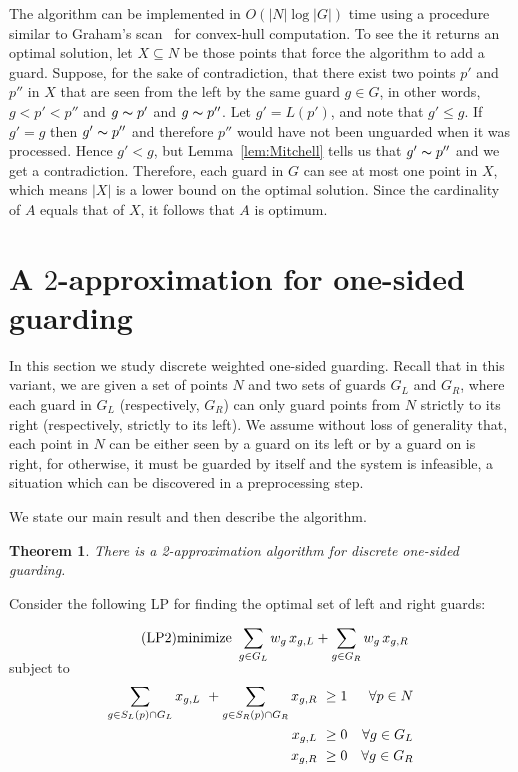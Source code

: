 \documentclass[11pt]{article}
\newcommand{\sees}{\thicksim}
\newtheorem{theorem}{Theorem}
\begin{document}
The algorithm can be implemented in $O(|N|\log|G|)$ time using a procedure
similar to Graham's scan~\cite{journals/ipl/Graham72} for convex-hull
computation. To see the it returns an optimal solution, let $X \subseteq N$ be
those points that force the algorithm to add a guard. Suppose, for the sake of
contradiction, that there exist two points $p'$ and $p''$ in $X$ that are seen
from the left by the same guard $g \in G$, in other words, $g< p'<p''$ and $g
\sees p'$ and $g \sees p''$. Let $g'=L(p')$, and note that $g'
\le g$. If $g' = g$ then $g'\sees p''$ and therefore $p''$ would have not been
unguarded when it was processed. Hence $g'<g$, but Lemma~\ref{lem:Mitchell}
tells us that $g'\sees p''$ and we get a contradiction. Therefore, each guard
in $G$ can see at most one point in $X$, which means $|X|$ is a lower bound on
the optimal solution. Since the cardinality of $A$ equals that of $X$, it
follows that $A$ is optimum.







\section{A $2$-approximation for one-sided guarding}
\label{sec:one-sided-guarding}

In this section we study discrete weighted one-sided guarding. Recall that in
this variant, we are given a set of points $N$ and two sets of guards $G_L$
and $G_R$, where each guard in $G_L$ (respectively, $G_R$) can only guard
points from $N$ strictly to its right (respectively, strictly to its left).
We assume without loss of generality that, each point in $N$ can be either
seen by a guard on its left or by a guard on is right, for otherwise, it must
be guarded by itself and the system is infeasible, a situation which can be
discovered in a preprocessing step.

We state our main result and then describe the algorithm.

\begin{theorem} \label{thm:one-sided}
  There is a 2-approximation algorithm for discrete one-sided guarding.
\end{theorem}

Consider the following LP for finding the optimal set of left and right guards:

\begin{gather} \label{LP:one-sided} \tag{LP2}
  \text{minimize} \ \sum_{g\in G_L} w_g\, x_{g,L} +  \sum_{g\in G_R}w_g\, x_{g,R} \\[-6ex] \notag
\end{gather}
\hspace{1.5cm} subject to \\[-3ex]
 \begin{align}
   \label{LP2:coverage-constraint}
\sum_{g\in S_L(p)\cap G_L} x_{g,L}\ + \sum_{g \in S_R(p)\cap G_R} x_{g,R}\  & \ge 1 & \forall p\in N \\
   \notag
   x_{g,L}\ & \ge 0 & \forall g\in G_L \\
   \notag
   x_{g,R} \ & \ge 0 & \forall g \in G_R
\end{align}
\end{document}
